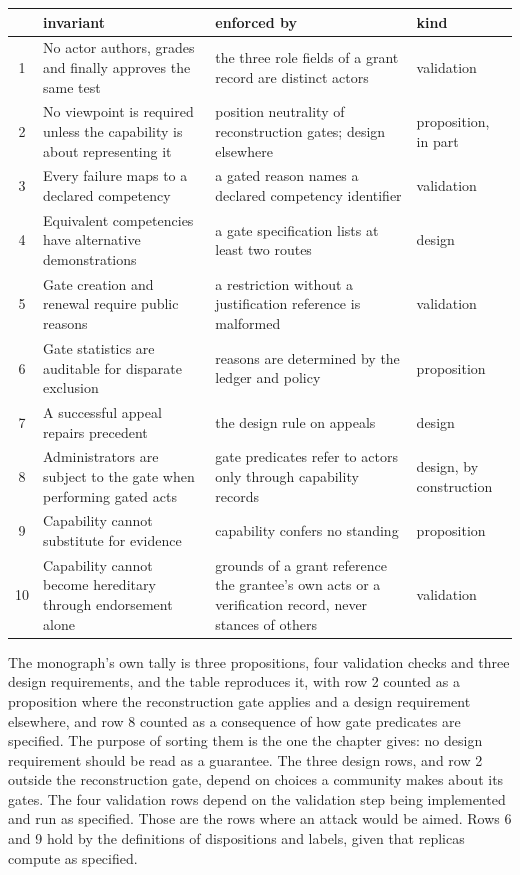 \documentclass[11pt]{article}
\begin{document}
\begin{center}
\small
\begin{tabularx}{\textwidth}{@{}c X X l@{}}
\toprule
& invariant & enforced by & kind\\
\midrule
1 & No actor authors, grades and finally approves the same test & the three role fields of a grant record are distinct actors & validation\\
2 & No viewpoint is required unless the capability is about representing it & position neutrality of reconstruction gates; design elsewhere & proposition, in part\\
3 & Every failure maps to a declared competency & a gated reason names a declared competency identifier & validation\\
4 & Equivalent competencies have alternative demonstrations & a gate specification lists at least two routes & design\\
5 & Gate creation and renewal require public reasons & a restriction without a justification reference is malformed & validation\\
6 & Gate statistics are auditable for disparate exclusion & reasons are determined by the ledger and policy & proposition\\
7 & A successful appeal repairs precedent & the design rule on appeals & design\\
8 & Administrators are subject to the gate when performing gated acts & gate predicates refer to actors only through capability records & design, by construction\\
9 & Capability cannot substitute for evidence & capability confers no standing & proposition\\
10 & Capability cannot become hereditary through endorsement alone & grounds of a grant reference the grantee's own acts or a verification record, never stances of others & validation\\
\bottomrule
\end{tabularx}
\end{center}

The monograph's own tally is three propositions, four validation checks and three design requirements, and the table reproduces it, with row 2 counted as a proposition where the reconstruction gate applies and a design requirement elsewhere, and row 8 counted as a consequence of how gate predicates are specified. The purpose of sorting them is the one the chapter gives: no design requirement should be read as a guarantee. The three design rows, and row 2 outside the reconstruction gate, depend on choices a community makes about its gates. The four validation rows depend on the validation step being implemented and run as specified. Those are the rows where an attack would be aimed. Rows 6 and 9 hold by the definitions of dispositions and labels, given that replicas compute as specified.
\end{document}
